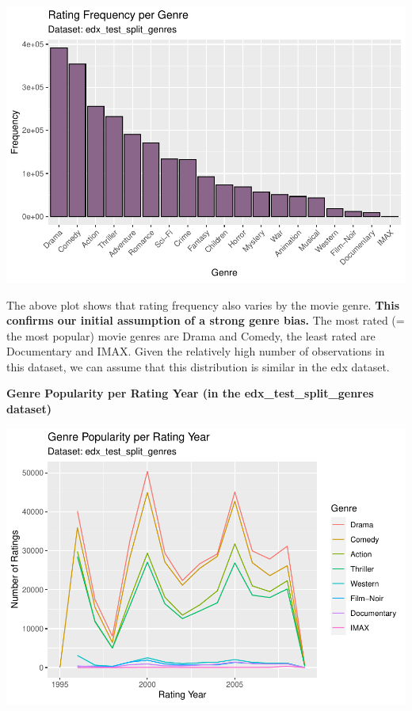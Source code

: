 \documentclass[
]{article}
\begin{document}
\begin{center}\includegraphics{MovieLens-Report_MitjaPrah_files/figure-latex/unnamed-chunk-28-1} \end{center}

The above plot shows that rating frequency also varies by the movie
genre. \textbf{This confirms our initial assumption of a strong genre
bias.} The most rated (= the most popular) movie genres are Drama and
Comedy, the least rated are Documentary and IMAX. Given the relatively
high number of observations in this dataset, we can assume that this
distribution is similar in the edx dataset.

\newpage

\textbf{Genre Popularity per Rating Year (in the
edx\_test\_split\_genres dataset)}

\begin{center}\includegraphics{MovieLens-Report_MitjaPrah_files/figure-latex/unnamed-chunk-29-1} \end{center}
\end{document}

